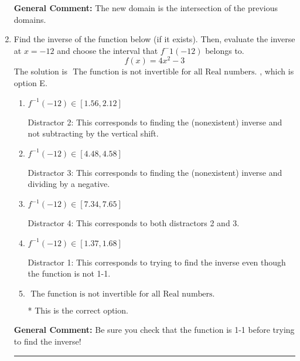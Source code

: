 \documentclass{extbook}[14pt]
\newcommand{\litem}[1]{\item #1

\rule{\textwidth}{0.4pt}}
\begin{document}
\begin{enumerate}
{\textbf{General Comment:} The new domain is the intersection of the previous domains.
}
\litem{
Find the inverse of the function below (if it exists). Then, evaluate the inverse at $x = -12$ and choose the interval that $f^-1(-12)$ belongs to.
\[ f(x) = 4 x^2 - 3 \]The solution is \( \text{ The function is not invertible for all Real numbers. } \), which is option E.\begin{enumerate}[label=\Alph*.]
\item \( f^{-1}(-12) \in [1.56, 2.12] \)

 Distractor 2: This corresponds to finding the (nonexistent) inverse and not subtracting by the vertical shift.
\item \( f^{-1}(-12) \in [4.48, 4.58] \)

 Distractor 3: This corresponds to finding the (nonexistent) inverse and dividing by a negative.
\item \( f^{-1}(-12) \in [7.34, 7.65] \)

 Distractor 4: This corresponds to both distractors 2 and 3.
\item \( f^{-1}(-12) \in [1.37, 1.68] \)

 Distractor 1: This corresponds to trying to find the inverse even though the function is not 1-1. 
\item \( \text{ The function is not invertible for all Real numbers. } \)

* This is the correct option.
\end{enumerate}

\textbf{General Comment:} Be sure you check that the function is 1-1 before trying to find the inverse!
}
\end{enumerate}
\end{document}
